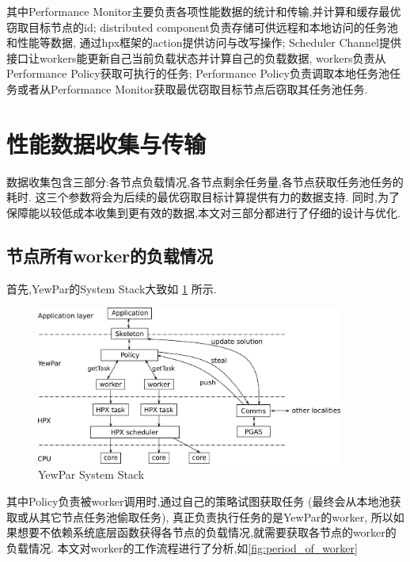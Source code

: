 \documentclass{mproj}
\begin{document}
其中Performance Monitor主要负责各项性能数据的统计和传输,并计算和缓存最优窃取目标节点的id;
distributed component负责存储可供远程和本地访问的任务池和性能等数据,
通过hpx框架的action提供访问与改写操作;
Scheduler Channel提供接口让workers能更新自己当前负载状态并计算自己的负载数据,
workers负责从Performance Policy获取可执行的任务;
Performance Policy负责调取本地任务池任务或者从Performance Monitor获取最优窃取目标节点后窃取其任务池任务.


\section{性能数据收集与传输}
数据收集包含三部分:各节点负载情况,各节点剩余任务量,各节点获取任务池任务的耗时.
这三个参数将会为后续的最优窃取目标计算提供有力的数据支持.
同时,为了保障能以较低成本收集到更有效的数据,本文对三部分都进行了仔细的设计与优化.

\subsection{节点所有worker的负载情况}
首先,YewPar的System Stack大致如
\cref{fig:yewpar_system_stack}
\cite{10.1007/978-3-030-29400-7_14}
所示.

\begin{figure}[h] %
    \centering %
    \includegraphics[width=0.9\textwidth]{images/YewPar_System_Stack.jpg} %
    \caption{YewPar System Stack} %
    \label{fig:yewpar_system_stack} %
\end{figure}
\FloatBarrier

其中Policy负责被worker调用时,通过自己的策略试图获取任务
(最终会从本地池获取或从其它节点任务池偷取任务),
真正负责执行任务的是YewPar的worker,
所以如果想要不依赖系统底层函数获得各节点的负载情况,就需要获取各节点的worker的负载情况.
本文对worker的工作流程进行了分析,如\cref{fig:period_of_worker}
\end{document}
